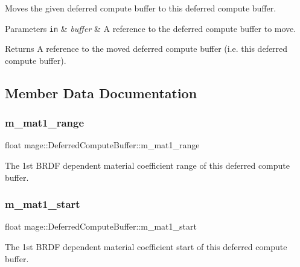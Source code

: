 Moves the given deferred compute buffer to this deferred compute buffer.


\begin{DoxyParams}[1]{Parameters}
\mbox{\tt in}  & {\em buffer} & A reference to the deferred compute buffer to move. \\
\hline
\end{DoxyParams}
\begin{DoxyReturn}{Returns}
A reference to the moved deferred compute buffer (i.\+e. this deferred compute buffer). 
\end{DoxyReturn}


\subsection{Member Data Documentation}
\hypertarget{structmage_1_1_deferred_compute_buffer_aeafb8d5b314c709c8b5234c4c30802a3}{}\label{structmage_1_1_deferred_compute_buffer_aeafb8d5b314c709c8b5234c4c30802a3} 
\subsubsection{\texorpdfstring{m\+\_\+mat1\+\_\+range}{m\_mat1\_range}}
{\footnotesize\ttfamily float mage\+::\+Deferred\+Compute\+Buffer\+::m\+\_\+mat1\+\_\+range}

The 1st B\+R\+DF dependent material coefficient range of this deferred compute buffer. \hypertarget{structmage_1_1_deferred_compute_buffer_a9579d7cab682b2bfe88bbf6025157a34}{}\label{structmage_1_1_deferred_compute_buffer_a9579d7cab682b2bfe88bbf6025157a34} 
\subsubsection{\texorpdfstring{m\+\_\+mat1\+\_\+start}{m\_mat1\_start}}
{\footnotesize\ttfamily float mage\+::\+Deferred\+Compute\+Buffer\+::m\+\_\+mat1\+\_\+start}

The 1st B\+R\+DF dependent material coefficient start of this deferred compute buffer. \hypertarget{structmage_1_1_deferred_compute_buffer_a90029cdc2dc3360ed396ec8213b52f09}{}\label{structmage_1_1_deferred_compute_buffer_a90029cdc2dc3360ed396ec8213b52f09} 
